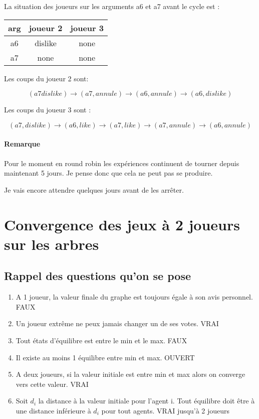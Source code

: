 \documentclass[12pt]{article}
\theoremstyle{defi}
\theoremstyle{not}
\theoremstyle{prob}
\begin{document}
        La situation des joueurs sur les arguments a6 et a7 avant le cycle est :

        \begin{tabular}{|c|c|c|}
          \hline
          arg & joueur 2 &  joueur 3\\
          \hline
          a6 & dislike & none \\
          \hline
          a7 & none & none \\
          \hline
        \end{tabular}

        Les coups du joueur 2 sont:

        $$(a7 dislike) \rightarrow (a7, annule) \rightarrow (a6, annule) \rightarrow (a6, dislike)$$

        Les coups du joueur 3 sont :

        $$(a7, dislike) \rightarrow (a6, like) \rightarrow (a7, like) \rightarrow (a7, annule) \rightarrow (a6, annule)$$

        \paragraph{Remarque}
          Pour le moment en round robin les expériences continuent de tourner depuis maintenant 5 jours. Je pense donc que cela ne peut pas se produire.

          Je vais encore attendre quelques jours avant de les arrêter.


\color{black}
  \section{Convergence des jeux à 2 joueurs sur les arbres}
    \subsection{Rappel des questions qu'on se pose}
      \begin{enumerate}
        \item A 1 joueur, la valeur finale du graphe est toujours égale à son avis personnel. FAUX
        \item Un joueur extrême ne peux jamais changer un de ses votes. VRAI
        \item Tout états d'équilibre est entre le min et le max. FAUX
        \item Il existe au moins 1 équilibre entre min et max. OUVERT
        \item A deux joueurs, si la valeur initiale est entre min et max alors on converge vers cette valeur. VRAI
        \item Soit $d_i$ la distance à la valeur initiale pour l'agent i. Tout équilibre doit être à une distance inférieure à $d_i$ pour tout agents. VRAI jusqu'à 2 joueurs
      \end{enumerate}
\end{document}
